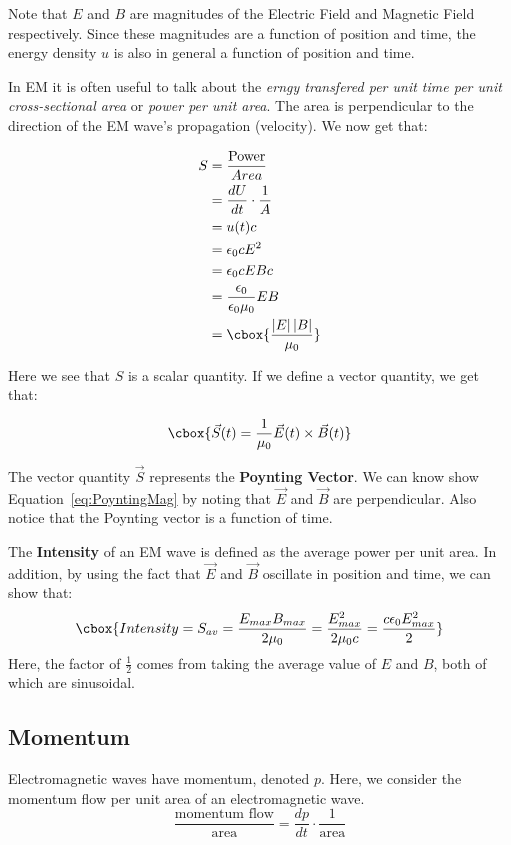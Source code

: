 \documentclass{hw}
\numberwithin{equation}{section}
\begin{document}
Note that $E$ and $B$ are magnitudes of the Electric Field and Magnetic Field
respectively. Since these magnitudes are a function of position and time, the
energy density $u$ is also in general a function of position and time.

In EM it is often useful to talk about the \textit{erngy transfered per unit
time per unit cross-sectional area} or \textit{power per unit area}. The area
is perpendicular to the direction of the EM wave's propagation (velocity). We
now get that:

\begin{align}
  S &= \frac{\text{Power}}{{Area}}             \\
    &= \frac{dU}{dt} \cdot \frac{1}{A}         \\
    &= u(t) c                                  \\
    &= \epsilon_0 cE^2                         \\
    &= \epsilon_0 c E Bc                       \\
    &= \frac{\epsilon_0}{\epsilon_0 \mu_0} E B \\
    &= \cbox{\frac{\left|E\right| \left|B\right|}{\mu_0}} \label{eq:PoyntingMag}
\end{align}

Here we see that $S$ is a scalar quantity. If we define a vector quantity, we
get that:

\begin{equation}
\cbox{%
  \vec{S}(t) = \frac{1}{\mu_0} \vec{E}(t) \times \vec{B}(t)
}
\end{equation}

The vector quantity $\vec{S}$ represents the \textbf{Poynting Vector}. We can
know show Equation~\ref{eq:PoyntingMag} by noting that $\vec{E}$ and $\vec{B}$
are perpendicular. Also notice that the Poynting vector is a function of time.

The \textbf{Intensity} of an EM wave is defined as the average power per unit
area. In addition, by using the fact that $\vec{E}$ and $\vec{B}$ oscillate in
position and time, we can show that: 
\begin{equation}
\cbox{%
  Intensity = S_{av} = \frac{E_{max} B_{max}}{2\mu_0} = \frac{E_{max}^2}{2\mu_0
  c} = \frac{c\epsilon_0 E_{max}^2}{2}
}
\end{equation}
Here, the factor of $\frac{1}{2}$ comes from taking the average value of $E$
and $B$, both of which are sinusoidal.

\subsection{Momentum}
Electromagnetic waves have momentum, denoted $p$. Here, we consider the
momentum flow per unit area of an electromagnetic wave.
\begin{equation}\label{eq:radiation-pressure}
  \frac{\text{momentum flow}}{\text{area}} 
    = \frac{dp}{dt} \cdot \frac{1}{\text{area}}
\end{equation}
\end{document}
